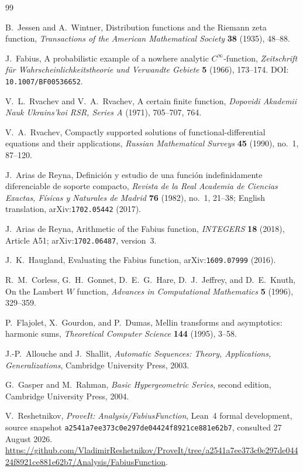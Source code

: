 \documentclass[11pt,oneside]{article}
\numberwithin{equation}{section}
\theoremstyle{definition}
\theoremstyle{remark}
\begin{document}
\begin{thebibliography}{99}

B.~Jessen and A.~Wintner,
\newblock Distribution functions and the Riemann zeta function,
\newblock \emph{Transactions of the American Mathematical Society} \textbf{38} (1935),
48--88.

J.~Fabius,
\newblock A probabilistic example of a nowhere analytic $C^\infty$-function,
\newblock \emph{Zeitschrift f\"ur Wahrscheinlichkeitstheorie und Verwandte Gebiete}
\textbf{5} (1966), 173--174.
\newblock DOI: \nolinkurl{10.1007/BF00536652}.

V.~L.~Rvachev and V.~A.~Rvachev,
\newblock A certain finite function,
\newblock \emph{Dopovidi Akademii Nauk Ukrains'koi RSR, Series A} (1971), 705--707, 764.

V.~A.~Rvachev,
\newblock Compactly supported solutions of functional-differential equations and their
applications,
\newblock \emph{Russian Mathematical Surveys} \textbf{45} (1990), no.~1, 87--120.

J.~Arias de Reyna,
\newblock Definici\'on y estudio de una funci\'on indefinidamente diferenciable de soporte
compacto,
\newblock \emph{Revista de la Real Academia de Ciencias Exactas, F\'isicas y Naturales de
Madrid} \textbf{76} (1982), no.~1, 21--38;
English translation, arXiv:\nolinkurl{1702.05442} (2017).

J.~Arias de Reyna,
\newblock Arithmetic of the Fabius function,
\newblock \emph{INTEGERS} \textbf{18} (2018), Article A51;
arXiv:\nolinkurl{1702.06487}, version~3.

J.~K.~Haugland,
\newblock Evaluating the Fabius function,
\newblock arXiv:\nolinkurl{1609.07999} (2016).

R.~M.~Corless, G.~H.~Gonnet, D.~E.~G.~Hare, D.~J.~Jeffrey, and D.~E.~Knuth,
\newblock On the Lambert $W$ function,
\newblock \emph{Advances in Computational Mathematics} \textbf{5} (1996), 329--359.

P.~Flajolet, X.~Gourdon, and P.~Dumas,
\newblock Mellin transforms and asymptotics: harmonic sums,
\newblock \emph{Theoretical Computer Science} \textbf{144} (1995), 3--58.

J.-P.~Allouche and J.~Shallit,
\newblock \emph{Automatic Sequences: Theory, Applications, Generalizations},
\newblock Cambridge University Press, 2003.

G.~Gasper and M.~Rahman,
\newblock \emph{Basic Hypergeometric Series}, second edition,
\newblock Cambridge University Press, 2004.

V.~Reshetnikov,
\newblock \emph{ProveIt: Analysis/FabiusFunction}, Lean~4 formal development,
source snapshot \texttt{a2541a7ee373c0e297de04424f8921ce881e62b7}, consulted 27 August 2026.
\newblock \url{https://github.com/VladimirReshetnikov/ProveIt/tree/a2541a7ee373c0e297de04424f8921ce881e62b7/Analysis/FabiusFunction}.

\end{thebibliography}
\end{document}
